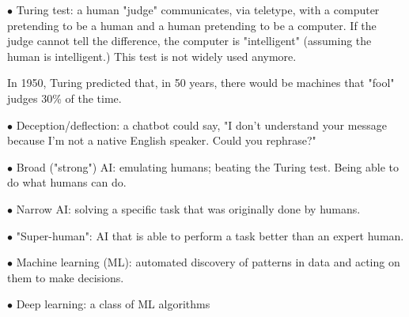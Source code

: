 \documentclass[english,openany]{book}
\begin{document}
    $\bullet$ Turing test: a human "judge" communicates, via teletype, with a computer pretending to be a human and a human pretending to be a computer. If the judge cannot tell the difference, the computer is "intelligent" (assuming the human is intelligent.) This test is not widely used anymore.

    In 1950, Turing predicted that, in 50 years, there would be machines that "fool" judges 30\% of the time.

    $\bullet$ Deception/deflection: a chatbot could say, "I don't understand your message because I'm not a native English speaker. Could you rephrase?"

    $\bullet$ Broad ("strong") AI: emulating humans; beating the Turing test. Being able to do what humans can do.

    $\bullet$ Narrow AI: solving a specific task that was originally done by humans.

    $\bullet$ "Super-human": AI that is able to perform a task better than an expert human.

    $\bullet$ Machine learning (ML): automated discovery of patterns in data and acting on them to make decisions.

    $\bullet$ Deep learning: a class of ML algorithms
\end{document}
